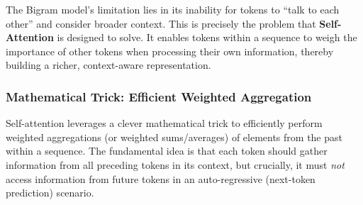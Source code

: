 The Bigram model's limitation lies in its inability for tokens to ``talk to each other'' and consider broader context. This is precisely the problem that \textbf{Self-Attention} is designed to solve. It enables tokens within a sequence to weigh the importance of other tokens when processing their own information, thereby building a richer, context-aware representation.

\subsubsection{Mathematical Trick: Efficient Weighted Aggregation}

Self-attention leverages a clever mathematical trick to efficiently perform weighted aggregations (or weighted sums/averages) of elements from the past within a sequence. The fundamental idea is that each token should gather information from all preceding tokens in its context, but crucially, it must \textit{not} access information from future tokens in an auto-regressive (next-token prediction) scenario.

